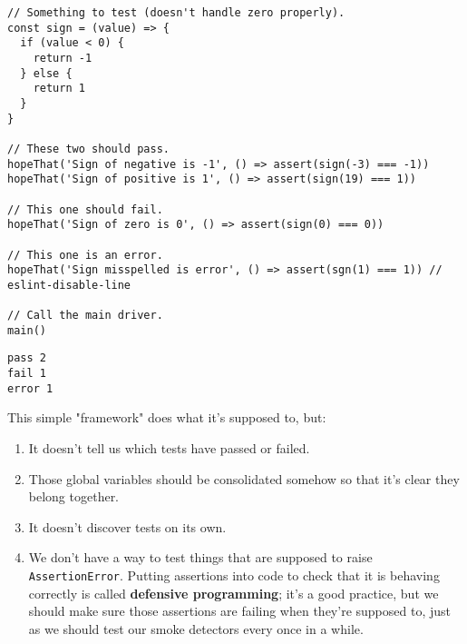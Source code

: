 \documentclass[krantzl]{krantz}
\newcommand{\glossref}[1]{\textbf{#1}}
\begin{document}
\begin{lstlisting}[frame=single,frameround=tttt]
// Something to test (doesn't handle zero properly).
const sign = (value) => {
  if (value < 0) {
    return -1
  } else {
    return 1
  }
}

// These two should pass.
hopeThat('Sign of negative is -1', () => assert(sign(-3) === -1))
hopeThat('Sign of positive is 1', () => assert(sign(19) === 1))

// This one should fail.
hopeThat('Sign of zero is 0', () => assert(sign(0) === 0))

// This one is an error.
hopeThat('Sign misspelled is error', () => assert(sgn(1) === 1)) // eslint-disable-line

// Call the main driver.
main()
\end{lstlisting}



\begin{lstlisting}[frame=single,frameround=tttt]
pass 2
fail 1
error 1
\end{lstlisting}



This simple "framework" does what it's supposed to, but:

\begin{enumerate}

\item 

It doesn't tell us which tests have passed or failed.



\item 

Those global variables should be consolidated somehow
    so that it's clear they belong together.



\item 

It doesn't discover tests on its own.



\item 

We don't have a way to test things that are supposed to raise \texttt{AssertionError}.
    Putting assertions into code to check that it is behaving correctly
    is called \glossref{defensive programming};
    it's a good practice,
    but we should make sure those assertions are failing when they're supposed to,
    just as we should test our smoke detectors every once in a while.



\end{enumerate}
\end{document}
